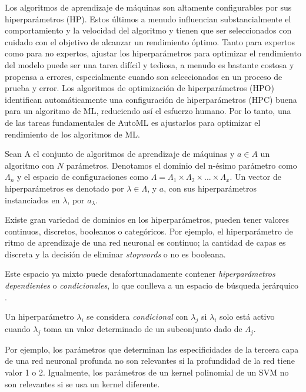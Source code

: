 Los algoritmos de aprendizaje de máquinas son altamente configurables por sus hiperparámetros (HP). Estos últimos a menudo influencian substancialmente el comportamiento y la velocidad del algoritmo y tienen que ser seleccionados con cuidado con el objetivo de alcanzar un rendimiento óptimo. Tanto para expertos como para no expertos, ajustar los hiperparámetros para optimizar el rendimiento del modelo puede ser una tarea difícil y tediosa, a menudo es bastante costosa y propensa a errores, especialmente cuando son seleccionados en un proceso de prueba y error. Los algoritmos de optimización de hiperparámetros (HPO) identifican automáticamente una configuración de hiperparámetros (HPC) buena para un algoritmo de ML, reduciendo así el esfuerzo humano. Por lo tanto, una de las tareas fundamentales de AutoML es ajustarlos para optimizar el rendimiento de los algoritmos de ML.

\begin{definition}
	Sean A el conjunto de algoritmos de aprendizaje de máquinas y $a \in A$ un algoritmo con $N$ parámetros. Denotamos el dominio del n-ésimo parámetro como $\Lambda_n$ y el espacio de configuraciones como $\Lambda = \Lambda_1 \times \Lambda_2 \times ... \times \Lambda_x$. Un vector de hiperparámetros es denotado por $\lambda \in \Lambda$, y $a$, con sus hiperparámetros instanciados en $\lambda$, por $a_\lambda$.
\end{definition}


Existe gran variedad de dominios en los hiperparámetros, pueden tener valores continuos, discretos, booleanos o categóricos. Por ejemplo, el hiperparámetro de ritmo de aprendizaje de una red neuronal es continuo; la cantidad de capas es discreta y la decisión de eliminar \textit{stopwords} o no es booleana. 

Este espacio ya mixto puede desafortunadamente contener \textit{hiperparámetros dependientes} o \textit{condicionales}, lo que conlleva a un espacio de búsqueda jerárquico \cite{bischl2021hyperparameter}.

\begin{definition}
	Un hiperparámetro $\lambda_i$ se considera \textit{condicional} con $\lambda_j$ si $\lambda_i$ solo está activo cuando $\lambda_j$ toma un valor determinado de un subconjunto dado de $\Lambda_j$.
\end{definition} 

Por ejemplo, los parámetros que determinan las especificidades de la tercera capa de una red neuronal profunda no son relevantes si la profundidad de la red tiene valor 1 o 2. Igualmente, los parámetros de un kernel polinomial de un SVM no son relevantes si se usa un kernel diferente.

